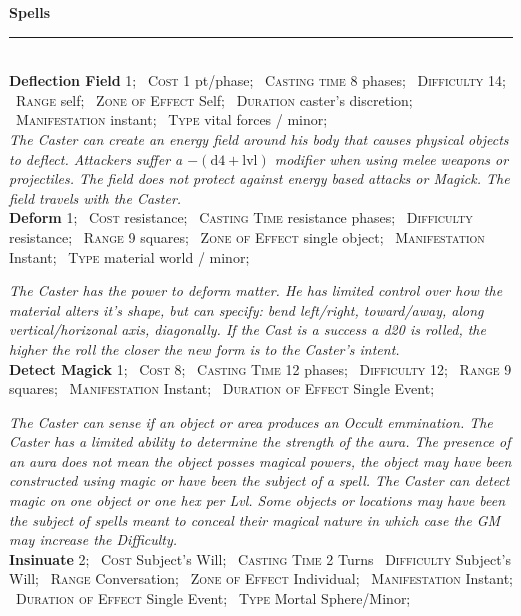 \documentclass[11pt]{article}
\newcommand{\heading}[1]{{\sc\bfseries #1}}
\newcommand{\spell}[1]{{\sc\bfseries\large #1}}
\begin{document}
\clearpage
\noindent
{\sc\bfseries\Large Spells}
\vspace*{4pt}
\hrule
%
\mbox{ }
\\[12pt]
%
\spell{Deflection Field} 1;
\ \textsc{Cost} 1 pt/phase;
\ \textsc{Casting time} 8 phases;
\ \textsc{Difficulty} 14;
\ \textsc{Range} self;
\ \textsc{Zone of Effect} Self;
\ \textsc{Duration} caster's discretion;
\ \textsc{Manifestation} instant;
\ \textsc{Type} vital forces / minor;
\\
\noindent\textsl{The Caster can create an energy field around his body
  that causes physical objects to deflect. Attackers suffer a
  $- (\mathrm{d4} + \mathrm{lvl})$ modifier when using melee weapons
  or projectiles. The field does not protect against energy based
  attacks or Magick. The field travels with the Caster.}
%
\\[6pt]
%
\spell{Deform} 1;
\ \textsc{Cost} resistance;
\ \textsc{Casting Time} resistance phases;
\ \textsc{Difficulty} resistance;
\ \textsc{Range} 9 squares;
\ \textsc{Zone of Effect} single object;
\ \textsc{Manifestation} Instant;
\ \textsc{Type} material world / minor;

\noindent\textsl{The Caster has the power to deform matter. He has
  limited control over how the material alters it's shape, but can
  specify: bend left/right, toward/away, along vertical/horizonal
  axis, diagonally. If the Cast is a success a d20 is rolled, the
  higher the roll the closer the new form is to the Caster's intent.}
%
\\[6pt]
%
\spell{Detect Magick} 1;
\ \textsc{Cost}	8;
\ \textsc{Casting Time}	12 phases;
\ \textsc{Difficulty} 12;
\ \textsc{Range} 9 squares;
\ \textsc{Manifestation} Instant;
\ \textsc{Duration of Effect} Single Event;

\noindent\textsl{The Caster can sense if an object or area produces an Occult
  emmination. The Caster has a limited ability to determine the
  strength of the aura. The presence of an aura does not mean the
  object posses magical powers, the object may have been constructed
  using magic or have been the subject of a spell. The Caster can
  detect magic on one object or one hex per Lvl. Some objects or
  locations may have been the subject of spells meant to conceal their
  magical nature in which case the GM may increase the Difficulty.}
%
\\[6pt]
%
\spell{Insinuate} 2;
\ \textsc{Cost} Subject's Will;
\ \textsc{Casting Time} 2 Turns
\ \textsc{Difficulty} Subject's Will;
\ \textsc{Range} Conversation;
\ \textsc{Zone of Effect} Individual;
\ \textsc{Manifestation} Instant;
\ \textsc{Duration of Effect} Single Event;
\ \textsc{Type} Mortal Sphere/Minor;
\end{document}
